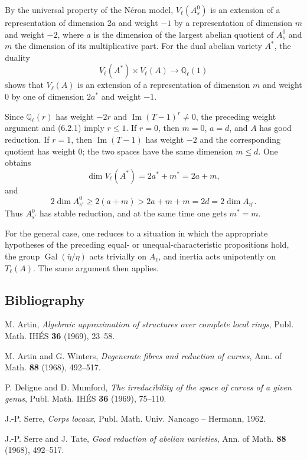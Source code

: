 \documentclass[12pt]{article}
\newcommand{\QQ}{\mathbb Q}
\newcommand{\Gal}{\operatorname{Gal}}
\begin{document}
By the universal property of the Néron model, $V_\ell(A_s^0)$ is an extension of a representation of dimension $2a$ and weight $-1$ by a representation of dimension $m$ and weight $-2$, where $a$ is the dimension of the largest abelian quotient of $A_s^0$ and $m$ the dimension of its multiplicative part. For the dual abelian variety $A^*$, the duality
\[
V_\ell(A^*)\times V_\ell(A)\to \QQ_\ell(1)
\]
shows that $V_\ell(A)$ is an extension of a representation of dimension $m$ and weight $0$ by one of dimension $2a^*$ and weight $-1$.

Since $\QQ_\ell(r)$ has weight $-2r$ and $\operatorname{Im}(T-1)^r\neq0$, the preceding weight argument and (6.2.1) imply $r\leq1$. If $r=0$, then $m=0$, $a=d$, and $A$ has good reduction. If $r=1$, then $\operatorname{Im}(T-1)$ has weight $-2$ and the corresponding quotient has weight $0$; the two spaces have the same dimension $m\leq d$. One obtains
\[
\dim V_\ell(A^*)=2a^*+m^*=2a+m,
\]
and
\[
2\dim A^0_{s'}\geq 2(a+m)>2a+m+m=2d=2\dim A_{\eta'}.
\]
Thus $A^0_{s'}$ has stable reduction, and at the same time one gets $m^*=m$.

For the general case, one reduces to a situation in which the appropriate hypotheses of the preceding equal- or unequal-characteristic propositions hold, the group $\Gal(\bar\eta/\eta)$ acts trivially on $A_\ell$, and inertia acts unipotently on $T_\ell(A)$. The same argument then applies.

\subsection*{Bibliography}
\begin{enumerate}[label={[\arabic*]}]
\item M. Artin, \emph{Algebraic approximation of structures over complete local rings}, Publ. Math. IHÉS \textbf{36} (1969), 23--58.
\item M. Artin and G. Winters, \emph{Degenerate fibres and reduction of curves}, Ann. of Math. \textbf{88} (1968), 492--517.
\item P. Deligne and D. Mumford, \emph{The irreducibility of the space of curves of a given genus}, Publ. Math. IHÉS \textbf{36} (1969), 75--110.
\item J.-P. Serre, \emph{Corps locaux}, Publ. Math. Univ. Nancago -- Hermann, 1962.
\item J.-P. Serre and J. Tate, \emph{Good reduction of abelian varieties}, Ann. of Math. \textbf{88} (1968), 492--517.
\end{enumerate}
\end{document}
